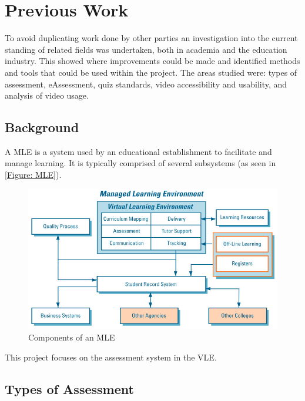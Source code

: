 \chapter{Previous Work}
\label{Chapter:Previous Work}

\begin{preamble}
	To avoid duplicating work done by other parties an investigation into the current standing of related fields was undertaken, both in academia and the education industry. This showed where improvements could be made and identified methods and tools that could be used within the project. The areas studied were: types of assessment, eAssessment, quiz standards, video accessibility and usability, and analysis of video usage.
\end{preamble}

\section{Background}
\label{Section: Background}
A \gls{MLE} is a system used by an educational establishment to facilitate and manage learning. It is typically comprised of several subsystems (as seen in \autoref{Figure: MLE}).

\begin{figure}[h]
	\centering
	\includegraphics[scale=0.4]{../figures/MLE.png}
	\caption{\label{Figure: MLE} Components of an \gls{MLE} \citep{mle}}
\end{figure}

This project focuses on the assessment system in the \gls{VLE}.

\section{Types of Assessment}
\label{Section: Types of Assessment}

